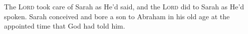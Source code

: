
\begin{inparaenum}
     The \textsc{Lord} took care of Sarah as He'd said, and the \textsc{Lord} did to Sarah as He'd spoken.%
     Sarah conceived and bore a son to Abraham in his old age at the appointed time that God had told him.%
\end{inparaenum}
